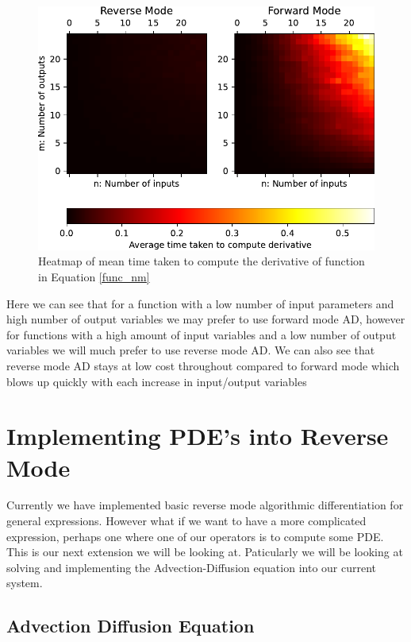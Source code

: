 \documentclass{article}
\begin{document}
\begin{figure}[h]
    \centering
    \includegraphics{images/Graph_HeatmapTimeDiff.pdf}
    \caption{Heatmap of mean time taken to compute the derivative of function in Equation \ref{func_nm}}
    \label{fig:heatmap}
\end{figure}

Here we can see that for a function with a low number of input parameters and high number of output variables we may prefer to use forward mode AD, however for functions with a high amount of input variables and a low number of output variables we will much prefer to use reverse mode AD. We can also see that reverse mode AD stays at low cost throughout compared to forward mode which blows up quickly with each increase in input/output variables



\newpage

\section{Implementing PDE's into Reverse Mode}

Currently we have implemented basic reverse mode algorithmic differentiation for general expressions. However what if we want to have a more complicated expression, perhaps one where one of our operators is to compute some PDE. This is our next extension we will be looking at. Paticularly we will be looking at solving and implementing the Advection-Diffusion equation into our current system.

\subsection{Advection Diffusion Equation}
\end{document}
